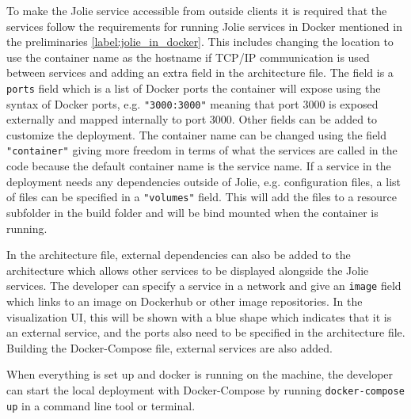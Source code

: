 To make the Jolie service accessible from outside clients it is required that the services follow the requirements for running Jolie services in Docker mentioned in the preliminaries \cref{label:jolie_in_docker}.
This includes changing the location to use the container name as the hostname if TCP/IP communication is used between services and adding an extra field in the architecture file.
The field is a \texttt{ports} field which is a list of Docker ports the container will expose using the syntax of Docker ports, e.g. \texttt{"3000:3000"} meaning that port 3000 is exposed externally and mapped internally to port 3000.
Other fields can be added to customize the deployment. The container name can be changed using the field \texttt{"container"} giving more freedom in terms of what the services are called in the code
because the default container name is the service name. If a service in the deployment needs any dependencies outside of Jolie, e.g. configuration files, a list of files can be specified in a \texttt{"volumes"} field.
This will add the files to a resource subfolder in the build folder and will be bind mounted when the container is running.

In the architecture file, external dependencies can also be added to the architecture which allows other services to be displayed alongside the Jolie services. The developer can specify a service in a network and give an \texttt{image} field
which links to an image on Dockerhub or other image repositories. In the visualization UI, this will be shown with a blue shape which indicates that it is an external service, and the ports also need to be specified in the architecture file.
Building the Docker-Compose file, external services are also added.

When everything is set up and docker is running on the machine, the developer can start the local deployment with Docker-Compose by running \texttt{docker-compose up} in a command line tool or terminal.
